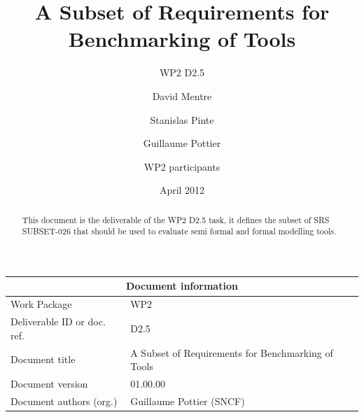 \documentclass{template/openetcs_report}
\begin{document}
\frontmatter
{}




\title{A Subset of Requirements for Benchmarking of Tools}

\subtitle{WP2 D2.5}

\date{April 2012}


\author{David Mentre}


\author{Stanislas Pinte}


\author{Guillaume Pottier}


\author{WP2 participants}




\begin{abstract}
This document is the deliverable of the WP2 D2.5 task, it defines the subset of SRS SUBSET-026 that should be used
to evaluate semi formal and formal modelling tools.
\end{abstract}

\maketitle

\begin{tabular}{|p{4.4cm}|p{8.7cm}|}
\hline
\multicolumn{2}{|c|}{Document information} \\
\hline
Work Package &  WP2  \\
Deliverable ID or doc. ref. & D2.5\\
\hline
Document title & A Subset of Requirements for Benchmarking of Tools \\
Document version & 01.00.00 \\
Document authors (org.)  & Guillaume Pottier (SNCF) \\
\hline
\end{tabular}
\end{document}
